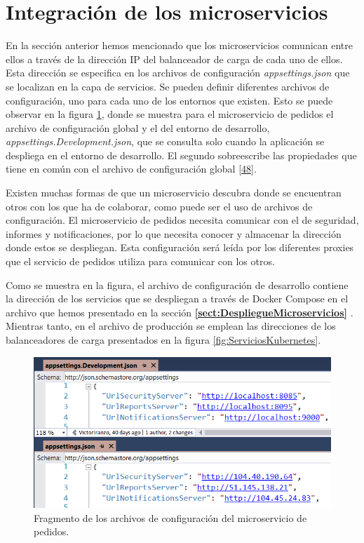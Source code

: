 \documentclass[11pt,spanish,listoffigures]{tfgetsinf}
\begin{document}
\section{Integración de los microservicios}

En la sección anterior hemos mencionado que los microservicios comunican entre ellos a través de la dirección IP del balanceador de carga de cada uno de ellos. Esta dirección se especifica en los archivos de configuración \textit{appsettings.json} que se localizan en la capa de servicios. Se pueden definir diferentes archivos de configuración, uno para cada uno de los entornos que existen. Esto se puede observar en la figura \ref{fig:appsettings}, donde se muestra para el microservicio de pedidos el archivo de configuración global y el del entorno de desarrollo, \textit{appsettings.Development.json}, que se consulta solo cuando la aplicación se despliega en el entorno de desarrollo. El segundo sobreescribe las propiedades que tiene en común con el archivo de configuración global \hyperlink{page.80}{[48]}.

Existen muchas formas de que un microservicio descubra donde se encuentran otros con los que ha de colaborar, como puede ser el uso de archivos de configuración. El microservicio de pedidos necesita comunicar con el de seguridad, informes y notificaciones, por lo que necesita conocer y almacenar la dirección donde estos se despliegan. Esta configuración será leída por los diferentes proxies que el servicio de pedidos utiliza para comunicar con los otros.

Como se muestra en la figura, el archivo de configuración de desarrollo contiene la dirección de los servicios que se despliegan a través de Docker Compose en el archivo que hemos presentado en la sección \textbf{\ref{sect:DespliegueMicroservicios} }. Mientras tanto, en el archivo de producción se emplean las direcciones de los balanceadores de carga presentados en la figura \ref{fig:ServiciosKubernetes}.

\begin{figure}[h]
\centering
\includegraphics[scale=0.7]{appsettings}
\caption{Fragmento de los archivos de configuración del microservicio de pedidos.}
\label{fig:appsettings}
\end{figure}
\end{document}
